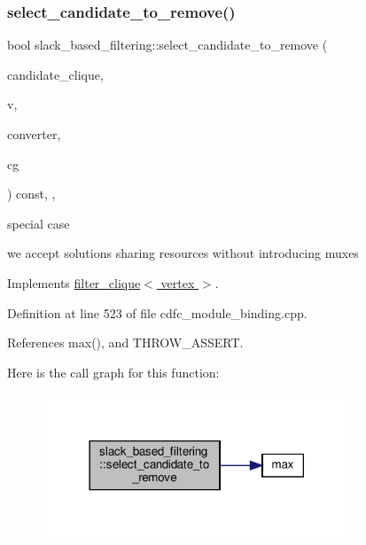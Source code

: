 \subsubsection{\texorpdfstring{select\+\_\+candidate\+\_\+to\+\_\+remove()}{select\_candidate\_to\_remove()}}
{\footnotesize\ttfamily bool slack\+\_\+based\+\_\+filtering\+::select\+\_\+candidate\+\_\+to\+\_\+remove (\begin{DoxyParamCaption}\item[{const \hyperlink{classCustomOrderedSet}{Custom\+Ordered\+Set}$<$ \hyperlink{clique__covering__graph_8hpp_a9cb45047ea8c5ed95a8cfa90494345aa}{C\+\_\+vertex} $>$ \&}]{candidate\+\_\+clique,  }\item[{\hyperlink{clique__covering__graph_8hpp_a9cb45047ea8c5ed95a8cfa90494345aa}{C\+\_\+vertex} \&}]{v,  }\item[{const std\+::map$<$ \hyperlink{clique__covering__graph_8hpp_a9cb45047ea8c5ed95a8cfa90494345aa}{C\+\_\+vertex}, \hyperlink{graph_8hpp_abefdcf0544e601805af44eca032cca14}{vertex} $>$ \&}]{converter,  }\item[{const \hyperlink{clique__covering__graph_8hpp_aa88e9419fe776ef37020cacd507cc4ad}{cc\+\_\+compatibility\+\_\+graph} \&}]{cg }\end{DoxyParamCaption}) const\hspace{0.3cm}{\ttfamily [inline]}, {\ttfamily [override]}, {\ttfamily [virtual]}}

special case

we accept solutions sharing resources without introducing muxes 

Implements \hyperlink{structfilter__clique_aaeef789b709e45c93269c6b137ea00ff}{filter\+\_\+clique$<$ vertex $>$}.



Definition at line 523 of file cdfc\+\_\+module\+\_\+binding.\+cpp.



References max(), and T\+H\+R\+O\+W\+\_\+\+A\+S\+S\+E\+RT.

Here is the call graph for this function\+:
\nopagebreak
\begin{figure}[H]
\begin{center}
\leavevmode
\includegraphics[width=261pt]{d6/d1b/structslack__based__filtering_aae278a39030283f377963834005d2ed0_cgraph}
\end{center}
\end{figure}


